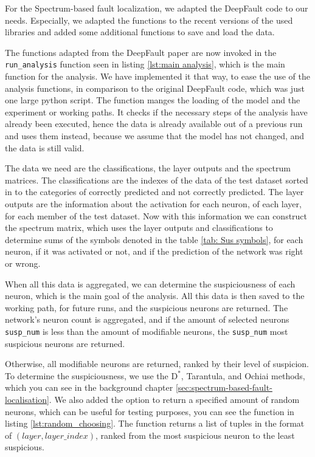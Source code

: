 For the Spectrum-based fault localization, we adapted the DeepFault \cite{eniser_deepfault_2023} code to our needs.
Especially, we adapted the functions to the recent versions of the used libraries and added some additional functions to save and load the data.

The functions adapted from the DeepFault paper are now invoked in the \texttt{run\_analysis} function seen in listing \ref{lst:main analysis}, which is the main function for the analysis.
We have implemented it that way, to ease the use of the analysis functions, in comparison to the original DeepFault code, which was just one large python script.
The function manges the loading of the model and the experiment or working paths.
It checks if the necessary steps of the analysis have already been executed, hence the data is already available out of a previous run and uses them instead, because we assume that the model has not changed, and the data is still valid.

The data we need are the classifications, the layer outputs and the spectrum matrices.
The classifications are the indexes of the data of the test dataset sorted in to the categories of correctly predicted and not correctly predicted.
The layer outputs are the information about the activation for each neuron, of each layer, for each member of the test dataset.
Now with this information we can construct the spectrum matrix, which uses the layer outputs and classifications to determine sums of the symbols denoted in the table \ref{tab: Sus symbols}, for each neuron, if it was activated or not, and if the prediction of the network was right or wrong.

When all this data is aggregated, we can determine the suspiciousness of each neuron, which is the main goal of the analysis.
All this data is then saved to the working path, for future runs, and the suspicious neurons are returned.
The network's neuron count is aggregated, and if the amount of selected neurons \texttt{susp\_num} is less than the amount of modifiable neurons, the \texttt{susp\_num} most suspicious neurons are returned.

Otherwise, all modifiable neurons are returned, ranked by their level of suspicion.
To determine the suspiciousness, we use the $\text{D}^*$, Tarantula, and Ochiai methods, which you can see in the background chapter \ref{sec:spectrum-based-fault-localisation}.
We also added the option to return a specified amount of random neurons, which can be useful for testing purposes, you can see the function in listing \ref{lst:random_choosing}.
The function returns a list of tuples in the format of $(layer, layer\_index)$, ranked from the most suspicious neuron to the least suspicious.

